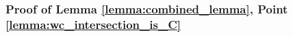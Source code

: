 









\subsubsection{Proof of Lemma \ref{lemma:combined_lemma}, Point \ref{lemma:wc_intersection_is_C}}


